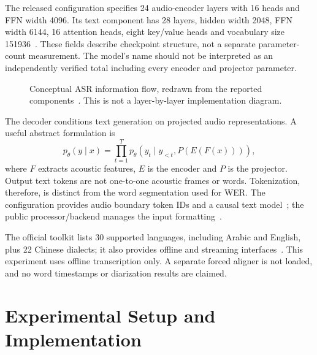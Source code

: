 \documentclass[conference]{IEEEtran}
\begin{document}
The released configuration specifies 24 audio-encoder layers with 16 heads and FFN width 4096. Its text component has 28 layers, hidden width 2048, FFN width 6144, 16 attention heads, eight key/value heads and vocabulary size 151936~\cite{config}. These fields describe checkpoint structure, not a separate parameter-count measurement. The model's name should not be interpreted as an independently verified total including every encoder and projector parameter.

\begin{figure}[t]
\centering\small
{}
\caption{Conceptual ASR information flow, redrawn from the reported components~\cite{qwenreport}. This is not a layer-by-layer implementation diagram.}
\label{fig:pipeline}
\end{figure}

The decoder conditions text generation on projected audio representations. A useful abstract formulation is
\begin{equation}
p_\theta(y\mid x)=\prod_{t=1}^{T}p_\theta(y_t\mid y_{<t},P(E(F(x)))),
\end{equation}
where $F$ extracts acoustic features, $E$ is the encoder and $P$ is the projector. Output text tokens are not one-to-one acoustic frames or words. Tokenization, therefore, is distinct from the word segmentation used for WER. The configuration provides audio boundary token IDs and a causal text model~\cite{config}; the public processor/backend manages the input formatting~\cite{toolkit}.

The official toolkit lists 30 supported languages, including Arabic and English, plus 22 Chinese dialects; it also provides offline and streaming interfaces~\cite{toolkit}. This experiment uses offline transcription only. A separate forced aligner is not loaded, and no word timestamps or diarization results are claimed.
\clearpage
\section{Experimental Setup and Implementation}
\end{document}
